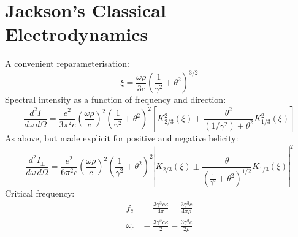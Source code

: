 \documentclass{article}
\begin{document}
\section{Jackson's Classical Electrodynamics}

A convenient reparameterisation:
\begin{equation}
    \xi = \frac{\omega\rho}{3c}\left(\frac{1}{\gamma^2} + \theta^2\right)^{3/2}
    \tag{J14.76}
\end{equation}
Spectral intensity as a function of frequency and direction:
\begin{equation}
    \frac{d^2I}{d\omega\,d\Omega} =
        \frac{e^2}{3\pi^2c}
        \left( \frac{\omega\rho}{c} \right)^2
        \left( \frac{1}{\gamma^2} + \theta^2 \right)^2
        \left[ K_{2/3}^2(\xi) + \frac{\theta^2}{(1/\gamma^2) + \theta^2} K_{1/3}^2(\xi) \right]
    \tag{J14.79}
\end{equation}
As above, but made explicit for positive and negative helicity:
\begin{equation}
    \frac{d^2I_\pm}{d\omega\,d\Omega} =
        \frac{e^2}{6\pi^2c}
        \left( \frac{\omega\rho}{c} \right)^2
        \left( \frac{1}{\gamma^2} + \theta^2 \right)^2
        \left| K_{2/3}(\xi) \pm \frac{\theta}{\left(\frac{1}{\gamma^2} + \theta^2\right)^{1/2}} K_{1/3}(\xi) \right|^2
    \tag{J Problem 14.25}
    \label{eqn:JP14_25}
\end{equation}
Critical frequency:
\begin{equation}
    \begin{aligned}
        f_c &= \frac{3\gamma^3 c\kappa}{4\pi}
             = \frac{3\gamma^3 c}{4\pi\rho} \\
        \omega_c &= \frac{3\gamma^3 c\kappa}{2}
                  = \frac{3\gamma^3 c}{2\rho}
    \end{aligned}
    \tag{J14.81}
\end{equation}
\end{document}
